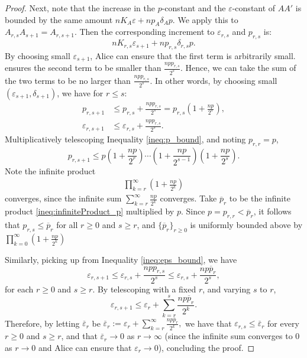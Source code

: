 \documentclass[11pt, letterpaper]{amsart}
\theoremstyle{plain}
\theoremstyle{definition}
\renewcommand{\epsilon}{\varepsilon}
\newcommand{\eps}{\epsilon}
\newcommand{\ov}[1]{\overline{#1}}
\begin{document}
\begin{proof}
  Next, note that the increase in the $p$-constant and the $\eps$-constant of
  $AA'$ is bounded by the same amount
    $nK_A\eps + np_A\delta_Ap.$
  We apply this to $A_{r,s}A_{s+1}=A_{r,s+1}$.
  Then the corresponding increment to $\eps_{r,s}$ and $p_{r,s}$ is:
  \[
    nK_{r,s}\eps_{s+1} + np_{r,s}\delta_{r,s}p.
  \]
  By choosing small $\eps_{s+1}$, Alice can ensure
  that the first term is arbitrarily small.  ensures the second 
  term to be smaller than $\frac{npp_{r,s}}{2^s}$. Hence, we can take the sum
  of the two terms to be no larger than $\frac{npp_{r,s}}{2^s}$. In other words,
  by choosing small $(\eps_{s+1},\delta_{s+1})$, we have for $r \le s$:
  \begin{align}
    p_{r,s+1} &\le p_{r,s} + \frac{npp_{r,s}}{2^s} = p_{r,s}\left( 1 + \frac{np}{2^s} \right), \label{ineq:p_bound}\tag{$\ast_1$} \\ 
  \eps_{r,s+1} &\le \eps_{r,s} + \frac{npp_{r,s}}{2^s}. \label{ineq:eps_bound}\tag{$\ast_2$}
  \end{align}
  Multiplicatively telescoping Inequality \eqref{ineq:p_bound}, and noting $p_{r,r}=p$,
  \[
    p_{r,s+1} \le p \left( 1 + \frac{np}{2^{r}} \right)\cdots\left( 1 +
      \frac{np}{2^{s-1}} \right)\left( 1 + \frac{np}{2^{s}} \right).
  \]
  Note the infinite product
  \begin{align}
    \label{ineq:infiniteProduct_p}
    \prod_{k = r}^\infty \left( 1+ \frac{np}{2^k} \right) \tag{$\ast\!\ast$}
  \end{align}
  converges, since the infinite sum
    $\sum_{k = r}^\infty \frac{np}{2^k}$
  converges. Take $\ov{p}_r$ to be the infinite
  product \eqref{ineq:infiniteProduct_p} multiplied by $p$. Since
  $p=p_{r,r}<\ov{p}_r$, it follows that $p_{r,s}\le \ov{p}_r$ for all
  $r \ge 0$ and $s \ge r$, and $\{\ov{p}_r\}_{r \ge 0}$ is uniformly bounded
  above by $
    \prod_{k = 0}^\infty \left( 1+ \frac{np}{2^k} \right)$

  Similarly, picking up from Inequality \eqref{ineq:eps_bound}, we have
  \[
  \eps_{r,s+1} \le \eps_{r,s} + \frac{npp_{r,s}}{2^s} \le
  \eps_{r,s} + \frac{np\ov{p}_r}{2^s},
\]
for each $r \ge 0$ and $s \ge r$.
By telescoping with a fixed $r$, and varying $s$ to $r$,
\[
  \eps_{r,s+1} \le \eps_r + \sum_{k=r}^s \frac{np\ov{p}_r}{2^k}.
\]
Therefore, by letting $\ov{\eps}_r$ be 
  $\ov{\eps}_r := \epsilon_r+\sum_{k=r}^\infty \frac{np\ov{p}_r}{2^k},$
we have that $\eps_{r,s} \le \ov{\eps}_r$ for every $r \ge 0$ and $s \ge r$, and that
$\ov{\eps}_r \to 0$ as $r \to \infty$ (since the infinite sum converges to $0$
as $r \to 0$ and Alice can ensure that
$\epsilon_r\to 0$), concluding the proof.
\end{proof}
\end{document}
